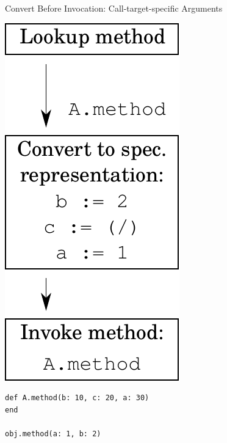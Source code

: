\documentclass[xcolor=dvipsname]{beamer} %
\begin{document}
\begin{frame}[fragile]{Convert Before Invocation: Call-target-specific Arguments}
\begin{minipage}{0.3\textwidth}
\centering
\includegraphics[height=0.6\textheight]{convert_before.pdf}
\end{minipage} %
\begin{minipage}{0.65\textwidth}
\begin{lstlisting}
def A.method(b: 10, c: 20, a: 30)
end

obj.method(a: 1, b: 2)
\end{lstlisting}
\end{minipage}
\end{frame}
\end{document}
